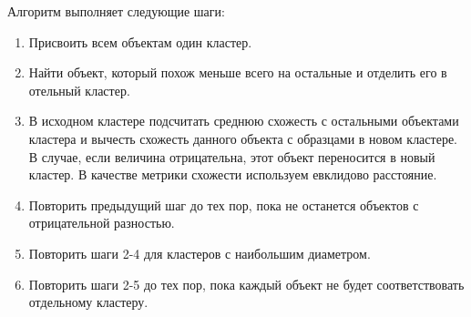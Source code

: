 \documentclass[12pt, a4paper]{article}
\begin{document}
Алгоритм выполняет следующие шаги:
\begin{enumerate}


\item Присвоить всем объектам один кластер.


\item Найти объект, который похож меньше всего на остальные и отделить его в отельный кластер.


\item В исходном кластере подсчитать среднюю схожесть с остальными объектами кластера и вычесть схожесть данного объекта с образцами в новом кластере. В случае, если величина отрицательна, этот объект переносится в новый кластер. В качестве метрики схожести используем евклидово расстояние.

\item Повторить предыдущий шаг до тех пор, пока не останется объектов с отрицательной разностью.

\item Повторить шаги 2-4 для кластеров с наибольшим диаметром.

\item Повторить шаги 2-5 до тех пор, пока каждый объект не будет соответствовать отдельному кластеру.
\end{enumerate}
\end{document}
